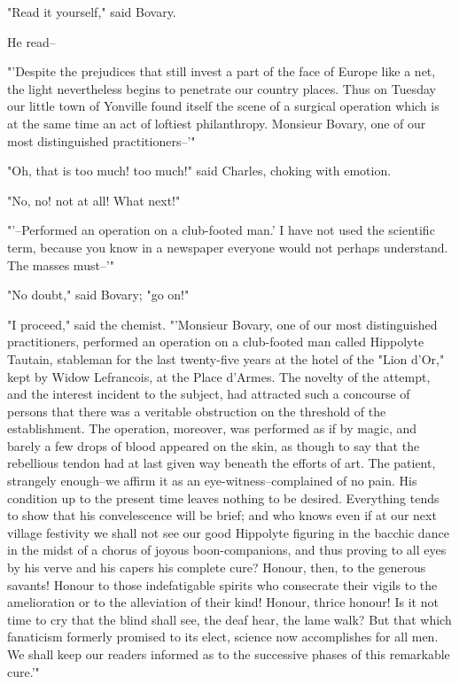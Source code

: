 \documentclass{tufte-book}
\begin{document}
"Read it yourself," said Bovary.

He read--

"'Despite the prejudices that still invest a part of the face of Europe
like a net, the light nevertheless begins to penetrate our country
places. Thus on Tuesday our little town of Yonville found itself the
scene of a surgical operation which is at the same time an act of
loftiest philanthropy. Monsieur Bovary, one of our most distinguished
practitioners--'"

"Oh, that is too much! too much!" said Charles, choking with emotion.

"No, no! not at all! What next!"

"'--Performed an operation on a club-footed man.' I have not used the
scientific term, because you know in a newspaper everyone would not
perhaps understand. The masses must--'"

"No doubt," said Bovary; "go on!"

"I proceed," said the chemist. "'Monsieur Bovary, one of our most
distinguished practitioners, performed an operation on a club-footed man
called Hippolyte Tautain, stableman for the last twenty-five years at
the hotel of the "Lion d'Or," kept by Widow Lefrancois, at the Place
d'Armes. The novelty of the attempt, and the interest incident to the
subject, had attracted such a concourse of persons that there was
a veritable obstruction on the threshold of the establishment. The
operation, moreover, was performed as if by magic, and barely a
few drops of blood appeared on the skin, as though to say that the
rebellious tendon had at last given way beneath the efforts of art. The
patient, strangely enough--we affirm it as an eye-witness--complained
of no pain. His condition up to the present time leaves nothing to be
desired. Everything tends to show that his convelescence will be brief;
and who knows even if at our next village festivity we shall not see our
good Hippolyte figuring in the bacchic dance in the midst of a chorus
of joyous boon-companions, and thus proving to all eyes by his verve
and his capers his complete cure? Honour, then, to the generous savants!
Honour to those indefatigable spirits who consecrate their vigils to the
amelioration or to the alleviation of their kind! Honour, thrice honour!
Is it not time to cry that the blind shall see, the deaf hear, the lame
walk? But that which fanaticism formerly promised to its elect, science
now accomplishes for all men. We shall keep our readers informed as to
the successive phases of this remarkable cure.'"
\end{document}
